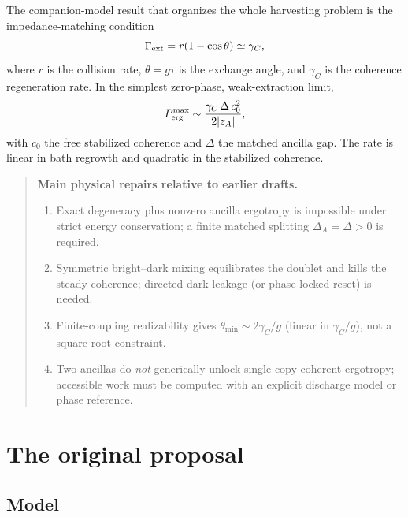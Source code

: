 \documentclass[11pt,a4paper]{article}
\newenvironment{notebox}{\begin{quote}\small}{\end{quote}}
\begin{document}
The companion-model result that organizes the whole harvesting problem is the impedance-matching condition
\begin{equation}
\Gamma_{\rm ext}=r(1-\cos\theta)\simeq \gamma_C,
\end{equation}
where $r$ is the collision rate, $\theta=g\tau$ is the exchange angle, and $\gamma_C$ is the coherence regeneration rate. In the simplest zero-phase, weak-extraction limit,
\begin{equation}
P_{\rm erg}^{\rm max}\sim \frac{\gamma_C\,\Delta\,c_0^2}{2|z_A|},
\end{equation}
with $c_0$ the free stabilized coherence and $\Delta$ the matched ancilla gap. The rate is linear in bath regrowth and quadratic in the stabilized coherence.

\begin{notebox}
\textbf{Main physical repairs relative to earlier drafts.}
\begin{enumerate}
\item Exact degeneracy plus nonzero ancilla ergotropy is impossible under strict energy conservation; a finite matched splitting $\Delta_A=\Delta>0$ is required.
\item Symmetric bright--dark mixing equilibrates the doublet and kills the steady coherence; directed dark leakage (or phase-locked reset) is needed.
\item Finite-coupling realizability gives $\theta_{\min}\sim 2\gamma_C/g$ (linear in $\gamma_C/g$), not a square-root constraint.
\item Two ancillas do \emph{not} generically unlock single-copy coherent ergotropy; accessible work must be computed with an explicit discharge model or phase reference.
\end{enumerate}
\end{notebox}

\section{The original proposal}\label{sec:setup}

\subsection{Model}
\end{document}
